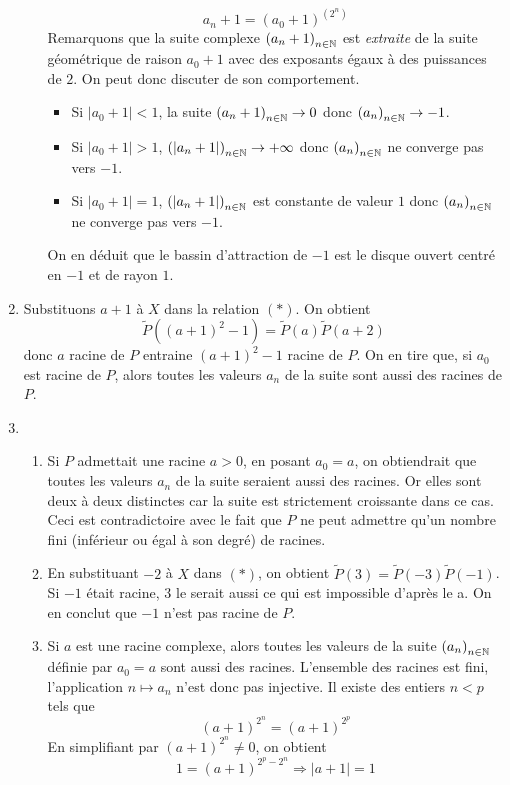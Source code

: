 \begin{enumerate}
\begin{enumerate}
\begin{displaymath}
 a_n +1 = (a_0+1)^{(2^n)}
\end{displaymath}
Remarquons que la suite complexe $\left( a_n+1\right) _{n\in \mathbb{N}}$ est \emph{extraite} de la suite géométrique de raison $a_0+1$ avec des exposants égaux à des puissances de $2$. On peut donc discuter de son comportement.
\begin{itemize}
 \item Si $|a_0+1|<1$, la suite $\left(a_n+1 \right) _{n\in \mathbb{N}}\rightarrow 0$ donc $\left(a_n \right) _{n\in \mathbb{N}}\rightarrow -1$.
 \item Si $|a_0+1|>1$, $\left(|a_n+1 |\right) _{n\in \mathbb{N}}\rightarrow +\infty$ donc $\left(a_n \right) _{n\in \mathbb{N}}$ ne converge pas vers $-1$.
 \item Si $|a_0+1|=1$, $\left(|a_n+1 |\right) _{n\in \mathbb{N}}$ est constante de valeur $1$ donc $\left(a_n \right) _{n\in \mathbb{N}}$ ne converge pas vers $-1$.
\end{itemize}
On en déduit que le bassin d'attraction de $-1$ est le disque ouvert centré en $-1$ et de rayon $1$.
\end{enumerate}

 \item Substituons $a+1$ à $X$ dans la relation $(*)$. On obtient
\begin{displaymath}
 \widetilde{P}((a+1)^2-1)=\widetilde{P}(a)\widetilde{P}(a+2)
\end{displaymath}
donc $a$ racine de $P$ entraine $(a+1)^2-1$ racine de $P$. On en tire que, si $a_0$ est racine de $P$, alors toutes les valeurs $a_n$ de la suite sont aussi des racines de $P$.

 \item
\begin{enumerate}
 \item Si $P$ admettait une racine $a>0$, en posant $a_0=a$, on obtiendrait que toutes les valeurs $a_n$ de la suite seraient aussi des racines. Or elles sont deux à deux distinctes car la suite est strictement croissante dans ce cas. Ceci est contradictoire avec le fait que $P$ ne peut admettre qu'un nombre fini (inférieur ou égal à son degré) de racines.
 \item En substituant $-2$ à $X$ dans $(*)$, on obtient $\widetilde{P}(3)=\widetilde{P}(-3)\widetilde{P}(-1)$.\newline
Si $-1$ était racine, $3$ le serait aussi ce qui est impossible d'après le a. On en conclut que  $-1$ n'est pas racine de $P$.
 \item Si $a$ est une racine complexe, alors toutes les valeurs de la suite $\left( a_n\right) _{n\in \mathbb{N}}$ définie par $a_0=a$ sont aussi des racines. L'ensemble des racines est fini, l'application $n\mapsto a_n$ n'est donc pas injective. Il existe des entiers $n<p$ tels que
\begin{displaymath}
 (a+1)^{2^n}=(a+1)^{2^p}
\end{displaymath}
En simplifiant par $(a+1)^{2^n}\neq 0$, on obtient
\begin{displaymath}
 1=(a+1)^{2^p-2^n} \Rightarrow |a+1| = 1
\end{displaymath}
\end{enumerate}


\end{enumerate}
